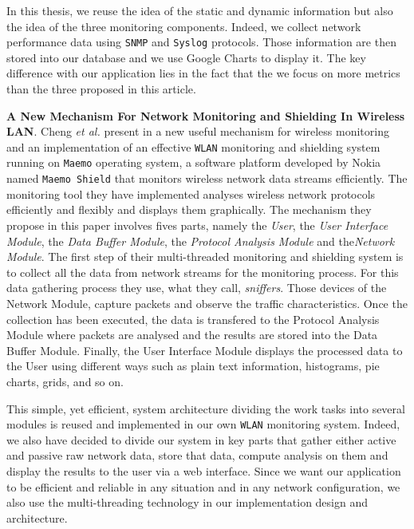 In this thesis, we reuse the idea of the static and dynamic information but also the idea of the three monitoring components. Indeed, we collect network performance data using \texttt{SNMP} and \texttt{Syslog} protocols. Those information are then stored into our database and we use Google Charts to display it. The key difference with our application lies in the fact that the we focus on more metrics than the three proposed in this article.


\textbf{A New Mechanism For Network Monitoring and Shielding In Wireless LAN}. Cheng \textit{et al.} present in \cite{article2} a new useful mechanism for wireless monitoring and an implementation of an effective \texttt{WLAN} monitoring and shielding system running on \texttt{Maemo} operating system, a software platform developed by Nokia named \texttt{Maemo Shield} that monitors wireless network data streams efficiently. The monitoring tool they have implemented analyses wireless network protocols efficiently and flexibly and displays them graphically. The mechanism they propose in this paper involves fives parts, namely the \textit{User}, the \textit{User Interface Module}, the \textit{Data Buffer Module}, the \textit{Protocol Analysis Module} and the\textit{Network Module}. The first step of their multi-threaded monitoring and shielding system is to collect all the data from network streams for the monitoring process. For this data gathering process they use, what they call, \textit{sniffers}. Those devices of the Network Module, capture packets and observe the traffic characteristics. Once the collection has been executed, the data is transfered to the Protocol Analysis Module where packets are analysed and the results are stored into the Data Buffer Module. Finally, the User Interface Module displays the processed data to the User using different ways such as plain text information, histograms, pie charts, grids, and so on.

This simple, yet efficient, system architecture dividing the work tasks into several modules is reused and implemented in our own \texttt{WLAN} monitoring system. Indeed, we also have decided to divide our system in key parts that gather either active and passive raw network data, store that data, compute analysis on them and display the results to the user via a web interface. Since we want our application to be efficient and reliable in any situation and in any network configuration, we also use the multi-threading technology in our implementation design and architecture.


